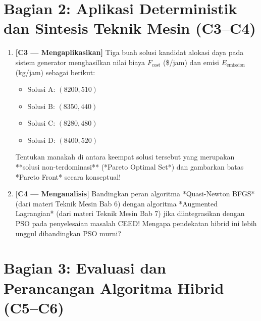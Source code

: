 \documentclass[11pt,a4paper]{article}
\begin{document}
\section*{Bagian 2: Aplikasi Deterministik dan Sintesis Teknik Mesin (C3--C4)}

\begin{enumerate}[label=\textbf{Soal \arabic*:}, leftmargin=*, resume]
    \item \textbf{[C3 --- Mengaplikasikan]} Tiga buah solusi kandidat alokasi daya pada sistem generator menghasilkan nilai biaya $F_{\text{cost}}$ (\$/jam) dan emisi $E_{\text{emission}}$ (kg/jam) sebagai berikut:
    \begin{itemize}
        \item Solusi A: $(8200, 510)$
        \item Solusi B: $(8350, 440)$
        \item Solusi C: $(8280, 480)$
        \item Solusi D: $(8400, 520)$
    \end{itemize}
    Tentukan manakah di antara keempat solusi tersebut yang merupakan **solusi non-terdominasi** (*Pareto Optimal Set*) dan gambarkan batas *Pareto Front* secara konseptual!
    
    \begin{tcolorbox}[colback=white,colframe=gray!50,height=5cm,title=Ruang Jawaban Soal 3]
    \end{tcolorbox}

    \item \textbf{[C4 --- Menganalisis]} Bandingkan peran algoritma *Quasi-Newton BFGS* (dari materi Teknik Mesin Bab 6) dengan algoritma *Augmented Lagrangian* (dari materi Teknik Mesin Bab 7) jika diintegrasikan dengan PSO pada penyelesaian masalah CEED! Mengapa pendekatan hibrid ini lebih unggul dibandingkan PSO murni?
    
    \begin{tcolorbox}[colback=white,colframe=gray!50,height=5.5cm,title=Ruang Jawaban Soal 4]
    \end{tcolorbox}
\end{enumerate}

\section*{Bagian 3: Evaluasi dan Perancangan Algoritma Hibrid (C5--C6)}
\end{document}
